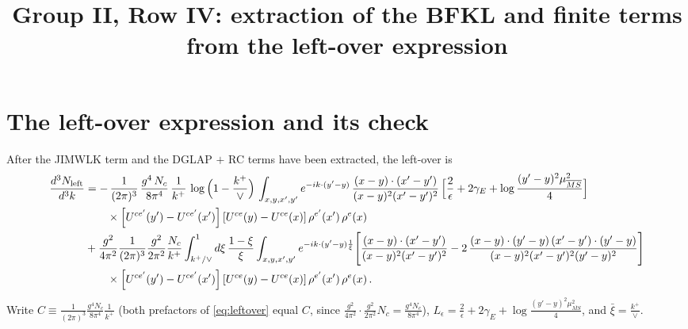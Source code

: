 \documentclass[10pt]{article}
\title{Group II, Row IV: extraction of the BFKL and finite terms\\ from the left-over expression}
\author{}
\date{}
\newcommand{\Leps}{L_{\epsilon}}
\newcommand{\Wbr}{\left[U^{ce'}(y') - U^{ce'}(x')\right] \left[U^{ce}(y) - U^{ce}(x)\right] \rho^{e'}(x')\, \rho^{e}(x)}
\begin{document}
\maketitle
\vspace{-2.5em}

\section{The left-over expression and its check}
After the JIMWLK term and the DGLAP $+$ RC terms have been extracted, the left-over is
\begin{align}\label{eq:leftover}
\frac{d^{3}N_{\rm left}}{d^{3}k}  & =
-\,\frac{1}{(2\pi)^{3}}\,\frac{g^{4}\,N_{c}}{8\pi^{4}}\,\frac{1}{k^{+}}\,\log\Big(1-\frac{k^{+}}{\vee}\Big)\,\int_{x,y,x',y'}e^{-ik\cdot(y'-y)}\,\frac{(x-y)\cdot(x'-y')}{(x-y)^{2}(x'-y')^{2}}\,\Big[\frac{2}{\epsilon}+2\gamma_{E}+\log\frac{(y'-y)^{2}\mu^{2}_{\overline{MS}}}{4}\Big]\notag \\ & \hspace{2em}\times\Wbr\notag\\
&+\frac{g^{2}}{4\pi^{2}}\frac{1}{(2\pi)^{3}}\frac{g^{2}}{2\pi^{2}}\frac{N_{c}}{k^{+}}\int_{k^{+}/\vee}^{1}d\xi\,\frac{1-\xi}{\xi}\int_{x,y,x',y'}e^{-ik\cdot(y'-y)\frac{1}{\xi}}\Bigg[\frac{(x-y)\cdot(x'-y')}{(x-y)^{2}(x'-y')^{2}}-2\,\frac{(x-y)\cdot(y'-y)\,(x'-y')\cdot(y'-y)}{(x-y)^{2}(x'-y')^{2}(y'-y)^{2}}\Bigg]\notag \\ & \hspace{2em}\times\Wbr\,.
\end{align}
Write $C\equiv\frac{1}{(2\pi)^{3}}\frac{g^{4}N_{c}}{8\pi^{4}}\frac{1}{k^{+}}$ (both prefactors
of \eqref{eq:leftover} equal $C$, since
$\frac{g^{2}}{4\pi^{2}}\cdot\frac{g^{2}}{2\pi^{2}}N_{c}=\frac{g^{4}N_{c}}{8\pi^{4}}$),
$\Leps=\frac{2}{\epsilon}+2\gamma_{E}+\log\frac{(y'-y)^{2}\mu^{2}_{\overline{MS}}}{4}$, and
$\bar\xi=\frac{k^{+}}{\vee}$.
\end{document}
